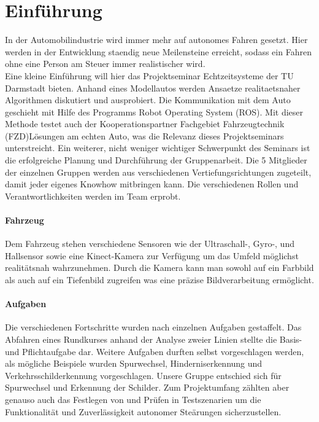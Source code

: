 \section{Einf{\"u}hrung}
\label{sec:intro}

In der Automobilindustrie wird immer mehr auf autonomes Fahren gesetzt. Hier werden in der Entwicklung staendig neue Meilensteine erreicht, sodass ein Fahren ohne eine Person am Steuer immer realistischer wird.
\\

Eine kleine Einf\"uhrung will hier das Projektseminar Echtzeitsysteme der TU Darmstadt bieten. Anhand eines Modellautos werden Ansaetze realitaetsnaher Algorithmen diskutiert und ausprobiert. Die Kommunikation mit dem Auto geschieht mit Hilfe des Programms Robot Operating System (ROS). Mit dieser Methode testet auch der Kooperationspartner \glqq Fachgebiet Fahrzeugtechnik (FZD)\grqq L\"osungen am echten Auto, was die Relevanz dieses Projektseminars unterstreicht.
Ein weiterer, nicht weniger wichtiger Schwerpunkt des Seminars ist die erfolgreiche Planung und Durchführung der Gruppenarbeit. Die 5 Mitglieder der einzelnen Gruppen werden aus verschiedenen Vertiefungsrichtungen zugeteilt, damit jeder eigenes Knowhow mitbringen kann. Die verschiedenen Rollen und Verantwortlichkeiten werden im Team erprobt.

\paragraph{Fahrzeug}
Dem Fahrzeug stehen verschiedene Sensoren wie der Ultraschall-, Gyro-, und Hallsensor sowie eine Kinect-Kamera zur Verf\"ugung um das Umfeld m\"oglichst realit\"atsnah wahrzunehmen. Durch die Kamera kann man sowohl auf ein Farbbild als auch auf ein Tiefenbild zugreifen was eine pr\"azise Bildverarbeitung erm\"oglicht.

\paragraph{Aufgaben}
Die verschiedenen Fortschritte wurden nach einzelnen Aufgaben gestaffelt. Das Abfahren eines Rundkurses anhand der Analyse zweier Linien stellte die Basis- und Pflichtaufgabe dar. Weitere Aufgaben durften selbst vorgeschlagen werden, als mögliche Beispiele wurden Spurwechsel, Hinderniserkennung und Verkehrsschilderkennung vorgeschlagen.
Unsere Gruppe entschied sich für Spurwechsel und Erkennung der Schilder.
Zum Projektumfang z\"ahlten aber genauso auch das Festlegen von und Pr\"ufen in Testszenarien um die Funktionalit\"at und Zuverl\"assigkeit autonomer Ste\"arungen sicherzustellen.  